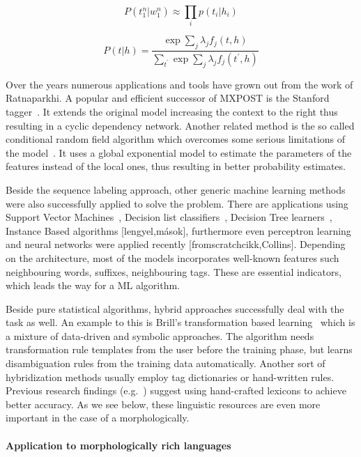 \begin{equation} P(t_1^n | w_1^n) \approx \prod_i p(t_i|h_i) \end{equation}

\begin{equation}
P(t|h) = \frac{\exp{\sum_j{\lambda_j f_j(t,h)}}}{\sum_{t^\prime}\exp{\sum_j{\lambda_j f_j(t^\prime,h)}}}
\end{equation}

Over the years numerous applications and tools have grown out from the work of Ratnaparkhi.
A popular and efficient successor of MXPOST is the Stanford tagger~\cite{}.
It extends the original model increasing the context to the right thus resulting in a cyclic dependency network.
Another related method is the so called conditional random field algorithm which overcomes some serious limitations of the model~\cite{Lafferty2001}.
It uses a global exponential model to estimate the parameters of the features instead of the local ones, thus resulting in better probability estimates.

Beside the sequence labeling approach, other generic machine learning methods were also successfully applied to solve the problem.
There are applications using Support Vector Machines~\cite{SVMTAgger}, Decision list classifiers~\cite{}, Decision Tree learners~\cite{lengyel}, Instance Based algorithms [lengyel,mások], furthermore even perceptron learning~\cite{lengyel} and neural networks were applied recently [fromscratchcikk,Collins].
Depending on the architecture, most of the models incorporates well-known features such neighbouring words, suffixes, neighbouring tags.
These are essential indicators, which leads the way for a ML algorithm.

Beside pure statistical algorithms, hybrid approaches successfully deal with the task as well.
An example to this is Brill’s transformation based learning~\cite{} which is a mixture of data-driven and symbolic approaches.
The algorithm needs transformation rule templates from the user before the training phase, but learns disambiguation rules from the training data automatically.
Another sort of hybridization methods usually employ tag dictionaries or hand-written rules.
Previous research findings (e.g.~\cite{Hajic,valamelyik_biomedical}) suggest using hand-crafted lexicons to achieve better accuracy.
As we see below, these linguistic resources are even more important in the case of a morphologically.

\paragraph{Application to morphologically rich languages}

